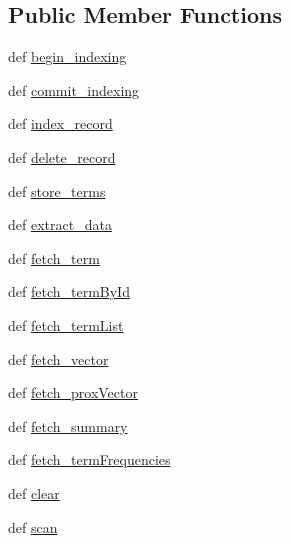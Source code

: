 \subsection*{Public Member Functions}
\begin{DoxyCompactItemize}
\item 
def \hyperlink{classcheshire3_1_1base_objects_1_1_index_ad77aeff04f0f4bef726aa032bedad495}{begin\-\_\-indexing}
\item 
def \hyperlink{classcheshire3_1_1base_objects_1_1_index_ab33b1427ef1cfab2c08f3de3ba2efefd}{commit\-\_\-indexing}
\item 
def \hyperlink{classcheshire3_1_1base_objects_1_1_index_a3a3cab7832a8f5276c6b8584f3cf186e}{index\-\_\-record}
\item 
def \hyperlink{classcheshire3_1_1base_objects_1_1_index_ae1ec23ac3ca6683f5a40d7f47db21857}{delete\-\_\-record}
\item 
def \hyperlink{classcheshire3_1_1base_objects_1_1_index_a330c9aee3ec1997e151cb51f5a2289da}{store\-\_\-terms}
\item 
def \hyperlink{classcheshire3_1_1base_objects_1_1_index_aaa73240449130f6956f3e5a2a69f46e0}{extract\-\_\-data}
\item 
def \hyperlink{classcheshire3_1_1base_objects_1_1_index_a7b1d34420920006bc0b91fb08722c288}{fetch\-\_\-term}
\item 
def \hyperlink{classcheshire3_1_1base_objects_1_1_index_a0eb3030e99321c780a0c8b54ae7f8657}{fetch\-\_\-term\-By\-Id}
\item 
def \hyperlink{classcheshire3_1_1base_objects_1_1_index_a865f04ec964daa72706c1b37878bd5ca}{fetch\-\_\-term\-List}
\item 
def \hyperlink{classcheshire3_1_1base_objects_1_1_index_a6a0578366453860d7c72995f569fede5}{fetch\-\_\-vector}
\item 
def \hyperlink{classcheshire3_1_1base_objects_1_1_index_adcd7ada909f676a10a77ae7323eb7444}{fetch\-\_\-prox\-Vector}
\item 
def \hyperlink{classcheshire3_1_1base_objects_1_1_index_af08222e254c3940e731d9ce143cbfc9e}{fetch\-\_\-summary}
\item 
def \hyperlink{classcheshire3_1_1base_objects_1_1_index_a76257b5ce4a76c29ca540c0133a05a72}{fetch\-\_\-term\-Frequencies}
\item 
def \hyperlink{classcheshire3_1_1base_objects_1_1_index_afe8fe219890f0f8591023dab7052db67}{clear}
\item 
def \hyperlink{classcheshire3_1_1base_objects_1_1_index_a72252d6ecaf9ab0235cb044b4c91d84c}{scan}

\end{DoxyCompactItemize}
